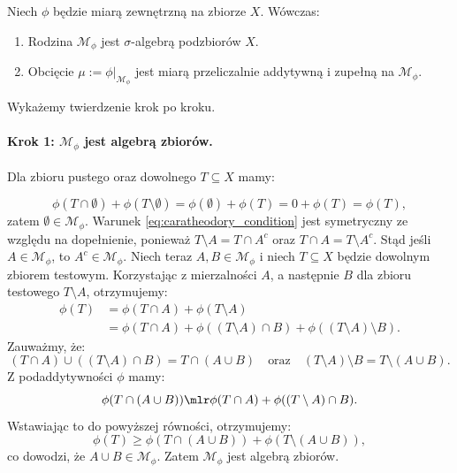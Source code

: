 \begin{tw}\label{tw:caratheodory}
    Niech $\phi$ będzie miarą zewnętrzną na zbiorze $X$. Wówczas:
    \begin{enumerate}
        \item[(i)] Rodzina $\mathcal{M}_\phi$ jest $\sigma$-algebrą podzbiorów $X$.
        \item[(ii)] Obcięcie $\mu := \phi|_{\mathcal{M}_\phi}$ jest miarą przeliczalnie addytywną i zupełną na $\mathcal{M}_\phi$.
    \end{enumerate}
\end{tw}
\begin{dow} Wykażemy twierdzenie krok po kroku.
    \paragraph{Krok 1: $\mathcal{M}_\phi$ jest algebrą zbiorów.} Dla zbioru pustego oraz dowolnego $T \subseteq X$ mamy:

    \begin{equation*} \phi(T \cap \emptyset) + \phi(T \setminus \emptyset) = \phi(\emptyset) + \phi(T) = 0 + \phi(T) = \phi(T),
    \end{equation*}
    zatem $\emptyset \in \mathcal{M}_\phi$. Warunek \eqref{eq:caratheodory_condition} jest symetryczny ze względu na dopełnienie, ponieważ $T \setminus A = T \cap A^c$ oraz $T \cap A = T \setminus A^c$.
    Stąd jeśli $A \in \mathcal{M}_\phi$, to $A^c \in \mathcal{M}_\phi$.
    Niech teraz $A, B \in \mathcal{M}_\phi$ i niech $T \subseteq X$ będzie dowolnym zbiorem testowym. Korzystając z mierzalności $A$, a następnie $B$ dla zbioru testowego $T \setminus A$, otrzymujemy:
    \begin{align}
        \phi(T) & = \phi(T \cap A) + \phi(T \setminus A)                                               \\
                & = \phi(T \cap A) + \phi((T \setminus A) \cap B) + \phi((T \setminus A) \setminus B).
    \end{align} Zauważmy, że:
    \begin{equation*}
        (T \cap A) \cup ((T \setminus A) \cap B) = T \cap (A \cup B) \quad \text{oraz} \quad (T \setminus A) \setminus B = T \setminus (A \cup B).
    \end{equation*}
    Z podaddytywności $\phi$ mamy:
    \begin{equation*}
        \phi(T \cap (A \cup B)) \mlr \phi(T \cap A) + \phi((T \setminus A) \cap B). \end{equation*}
    Wstawiając to do powyższej równości, otrzymujemy:
    \begin{equation*}
        \phi(T) \ge \phi(T \cap (A \cup B)) + \phi(T \setminus (A \cup B)),
    \end{equation*}
    co dowodzi, że $A \cup B \in \mathcal{M}_\phi$. Zatem $\mathcal{M}_\phi$ jest algebrą zbiorów.


\end{dow}
